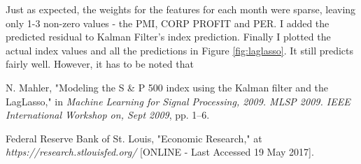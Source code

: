 \documentclass[11pt, fleqn]{article}
\begin{document}
Just as expected, the weights for the features for each month were sparse, leaving only 1-3 non-zero values - the PMI, CORP PROFIT and PER. I added the predicted residual to Kalman Filter's index prediction. Finally I plotted the actual index values and all the predictions in Figure \ref{fig:laglasso}. It still predicts fairly well. However, it has to be noted that

\begin{thebibliography}{9}
N. Mahler, "Modeling the S \& P 500 index using the Kalman filter and the LagLasso," in \textit{Machine Learning for Signal Processing, 2009. MLSP 2009. IEEE International Workshop on, Sept 2009}, pp. 1–6.

Federal Reserve Bank of St. Louis, "Economic Research," at \textit{https://research.stlouisfed.org/} [ONLINE - Last Accessed 19 May 2017].

\end{thebibliography}
\end{document}
